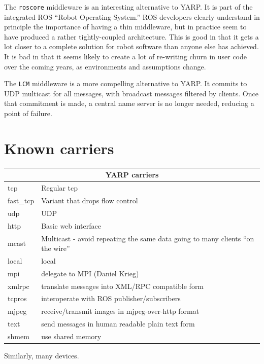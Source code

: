 \documentclass[letterpaper]{article}
\begin{document}
The {\tt roscore} middleware \cite{quigley2009ros} is an
interesting alternative to YARP.  
It is part of the integrated ROS ``Robot Operating
System.''  ROS developers clearly understand in principle the
importance of having a thin middleware, but in practice seem to have
produced a rather tightly-coupled architecture.  This is good in that
it gets a lot closer to a complete solution for robot software than
anyone else has achieved.  It is bad in that it seems likely to create
a lot of re-writing churn in user code over the coming years, as
environments and assumptions change.

The {\tt LCM} middleware \cite{huang2010lcm} is a more compelling
alternative to YARP.  It commits to UDP multicast for all messages,
with broadcast messages filtered by clients.  Once that commitment is
made, a central name server is no longer needed, reducing a point of
failure.




\clearpage
\newpage


\section{Known carriers}

\begin{tabular}{|l|p{7cm}|}
\hline
\multicolumn{2}{|c|}{YARP carriers} \\
\hline
tcp & Regular tcp \\
fast\_tcp & Variant that drops flow control \\
udp & UDP \\
http & Basic web interface \\
mcast & Multicast - avoid repeating the same data going
to many clients ``on the wire''  \\
local & local \\
mpi & delegate to MPI (Daniel Krieg) \\
xmlrpc & translate messages into XML/RPC compatible form \\
tcpros & interoperate with ROS publisher/subscribers \\
mjpeg & receive/transmit images in mjpeg-over-http format \\
text & send messages in human readable plain text form \\
shmem & use shared memory \\
\hline
\end{tabular}

Similarly, many devices.
\end{document}
